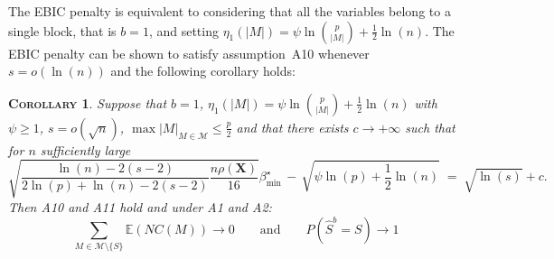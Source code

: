 \documentclass[aos]{imsart}
\theoremstyle{plain}
\newtheorem{cor}[thm]{\textsc{Corollary}}
\newcommand{\E}{\mathbb{E}}
\newcommand{\M}{\mathcal{M}}
\newcommand{\bs}{\boldsymbol}
\begin{document}
The EBIC penalty is equivalent to considering that all the variables belong to a single block, that is $b=1$, and setting $\eta_1(|M|)=\psi\ln{\binom{p}{|M|}} + \tfrac{1}{2}\ln(n)$. The EBIC penalty can be shown to satisfy assumption~A10 whenever $s=o(\ln(n))$ and the following corollary holds:
\begin{cor}
    Suppose that $b=1$, $\eta_1(|M|)=\psi \ln {\binom{p}{|M|}} + \tfrac{1}{2}\ln(n)$ with $\psi\geq1$, $s=o(\sqrt{n})$, $\max|M|_{M\in\M} \leq \tfrac{p}{2}$ and that there exists $c\to +\infty$ such that for $n$ sufficiently large
    \begin{equation}\label{eq:betaminebic}
        \sqrt{\frac{\ln(n)-2(s-2)}{2 \ln(p)+\ln(n)-2(s-2)}\frac{n\rho(\bs X)}{16}}{{\beta_{\min}^{\star}}} \,- \,\sqrt{\psi\ln(p) + \frac{1}{2}\ln(n)} \;=\; \sqrt{\ln(s)} + c .
    \end{equation}
    Then A10 and A11 hold and under A1 and A2: $$\sum_{M \in \M\setminus \{S\}}\E\left(NC(M)\right)\to 0 \qquad \mbox{and} \qquad P(\widehat{S}^b = S) \to 1$$    
\end{cor}
\end{document}
